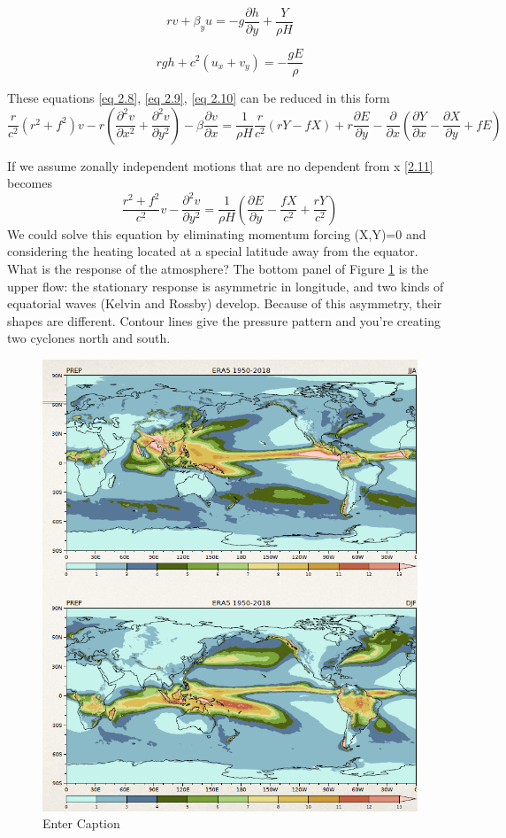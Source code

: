 \begin{equation}\label{eq 2.9}
	r v +\beta_y u = -g \frac{\partial h}{\partial y} + \frac{Y}{\rho H}
\end{equation}

\begin{equation}\label{eq 2.10}
	r g h + c^2 (u_x + v_y) = -\frac{gE}{\rho}
\end{equation}



These equations \ref{eq 2.8}, \ref{eq 2.9}, \ref{eq 2.10} can be reduced in this form
\begin{equation}\label{2.11}
	\frac{r}{c^2} \left( r^2 + f^2 \right) v - r \left( \frac{\partial^2 v}{\partial x^2} + \frac{\partial^2 v}{\partial y^2} \right) - \beta \frac{\partial v}{\partial x}
	= \frac{1}{\rho H} \frac{r}{c^2} \left( rY - fX \right) + r \frac{\partial E}{\partial y} - \frac{\partial}{\partial x} \left( \frac{\partial Y}{\partial x} - \frac{\partial X}{\partial y} + fE \right)
\end{equation}

If we assume zonally independent motions that are no dependent from x \ref{2.11} becomes
\begin{equation}
	\frac{r^2 + f^2}{c^2} v - \frac{\partial^2 v}{\partial y^2} = \frac{1}{\rho H} \left( \frac{\partial E}{\partial y} - \frac{fX}{c^2} + \frac{rY}{c^2} \right)
\end{equation}
We could solve this equation by eliminating momentum forcing (X,Y)=0 and considering the heating located at a special latitude away from the equator.\\[0.5 cm]

What is the response of the atmosphere?
The bottom panel of Figure \ref{fig: fig2.1} is the upper flow: the stationary response is asymmetric in longitude, and two kinds of equatorial waves (Kelvin and Rossby) develop. Because of this asymmetry, their shapes are different.
Contour lines give the pressure pattern and you're creating two cyclones north and south.
\begin{figure}[h!]
	\centering
	\includegraphics[width=0.5\linewidth]{uploads/24image.png}
	\caption{Enter Caption}
	\label{fig: fig2.1}
\end{figure}

